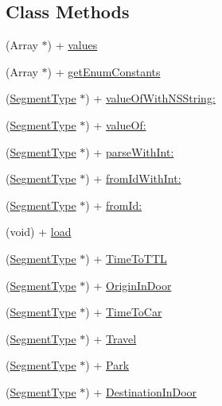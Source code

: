 \subsection*{Class Methods}
\begin{DoxyCompactItemize}
\item 
(Array $\ast$) + \hyperlink{interface_segment_type_aa8911e3c44177912677dfd8e1fe1518d}{values}
\item 
(Array $\ast$) + \hyperlink{interface_segment_type_a1b210b505ec18e368a3a17edf04e523f}{get\+Enum\+Constants}
\item 
(\hyperlink{interface_segment_type}{Segment\+Type} $\ast$) + \hyperlink{interface_segment_type_a2d764d5824ddaaa95f128f2fb07b5d88}{value\+Of\+With\+N\+S\+String\+:}
\item 
(\hyperlink{interface_segment_type}{Segment\+Type} $\ast$) + \hyperlink{interface_segment_type_a6b15d1083ac29172522d2e38781f5827}{value\+Of\+:}
\item 
(\hyperlink{interface_segment_type}{Segment\+Type} $\ast$) + \hyperlink{interface_segment_type_a86c2a0acf85456c4944f3dfbef71a6d1}{parse\+With\+Int\+:}
\item 
(\hyperlink{interface_segment_type}{Segment\+Type} $\ast$) + \hyperlink{interface_segment_type_a1219969b1dc9312ce7c0a974864a71fb}{from\+Id\+With\+Int\+:}
\item 
(\hyperlink{interface_segment_type}{Segment\+Type} $\ast$) + \hyperlink{interface_segment_type_a654681058eb20abc05a0afb6271cdbfd}{from\+Id\+:}
\item 
(void) + \hyperlink{interface_segment_type_aa27bbf2850c6688cf1e1e63f52065edc}{load}
\item 
(\hyperlink{interface_segment_type}{Segment\+Type} $\ast$) + \hyperlink{interface_segment_type_afb27d7225ff042eeb68240f9ee35abf9}{Time\+To\+T\+T\+L}
\item 
(\hyperlink{interface_segment_type}{Segment\+Type} $\ast$) + \hyperlink{interface_segment_type_af7fae81497cf4ead574517d457898d11}{Origin\+In\+Door}
\item 
(\hyperlink{interface_segment_type}{Segment\+Type} $\ast$) + \hyperlink{interface_segment_type_a74e5aa1d86be017fe903e68059cc1f8d}{Time\+To\+Car}
\item 
(\hyperlink{interface_segment_type}{Segment\+Type} $\ast$) + \hyperlink{interface_segment_type_a2892b704665e01342131d0c2ad5541b5}{Travel}
\item 
(\hyperlink{interface_segment_type}{Segment\+Type} $\ast$) + \hyperlink{interface_segment_type_ac016b6d1639021aff88cd0f49ccff8fd}{Park}
\item 
(\hyperlink{interface_segment_type}{Segment\+Type} $\ast$) + \hyperlink{interface_segment_type_a680ec05059836abb538132fac891fb47}{Destination\+In\+Door}
\end{DoxyCompactItemize}


